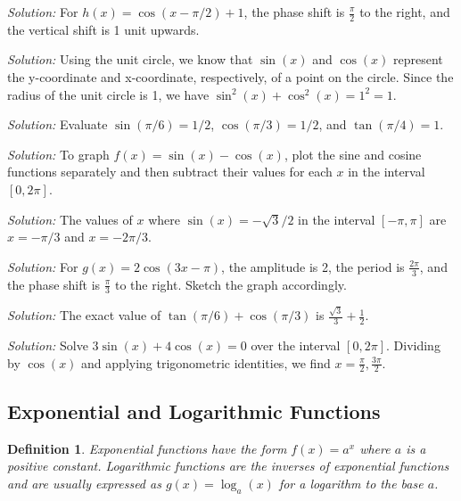 \documentclass[a4paper,12pt]{book}
\newenvironment{solution}[1][]
{\par\noindent\textit{Solution:} \rmfamily}{\medskip}
\newtheorem{definition}{Definition}
\begin{document}
\begin{solution}[3]
For \( h(x) = \cos(x - \pi/2) + 1 \), the phase shift is \( \frac{\pi}{2} \) to the right, and the vertical shift is 1 unit upwards.
\end{solution}

\begin{solution}[4]
Using the unit circle, we know that \( \sin(x) \) and \( \cos(x) \) represent the y-coordinate and x-coordinate, respectively, of a point on the circle. Since the radius of the unit circle is 1, we have \( \sin^2(x) + \cos^2(x) = 1^2 = 1 \).
\end{solution}

\begin{solution}[5]
Evaluate \( \sin(\pi/6) = 1/2 \), \( \cos(\pi/3) = 1/2 \), and \( \tan(\pi/4) = 1 \).
\end{solution}

\begin{solution}[6]
To graph \( f(x) = \sin(x) - \cos(x) \), plot the sine and cosine functions separately and then subtract their values for each \( x \) in the interval \([0, 2\pi]\).
\end{solution}

\begin{solution}[7]
The values of \( x \) where \( \sin(x) = -\sqrt{3}/2 \) in the interval \([-\pi, \pi]\) are \( x = -\pi/3 \) and \( x = -2\pi/3 \).
\end{solution}

\begin{solution}[8]
For \( g(x) = 2\cos(3x - \pi) \), the amplitude is 2, the period is \( \frac{2\pi}{3} \), and the phase shift is \( \frac{\pi}{3} \) to the right. Sketch the graph accordingly.
\end{solution}

\begin{solution}[9]
The exact value of \( \tan(\pi/6) + \cos(\pi/3) \) is \( \frac{\sqrt{3}}{3} + \frac{1}{2} \).
\end{solution}

\begin{solution}[10]
Solve \( 3\sin(x) + 4\cos(x) = 0 \) over the interval \([0, 2\pi]\). Dividing by \( \cos(x) \) and applying trigonometric identities, we find \( x = \frac{\pi}{2}, \frac{3\pi}{2} \).
\end{solution}

\subsection{Exponential and Logarithmic Functions}
\begin{definition}
Exponential functions have the form \( f(x) = a^x \) where \( a \) is a positive constant. Logarithmic functions are the inverses of exponential functions and are usually expressed as \( g(x) = \log_a(x) \) for a logarithm to the base \( a \).
\end{definition}
\end{document}
